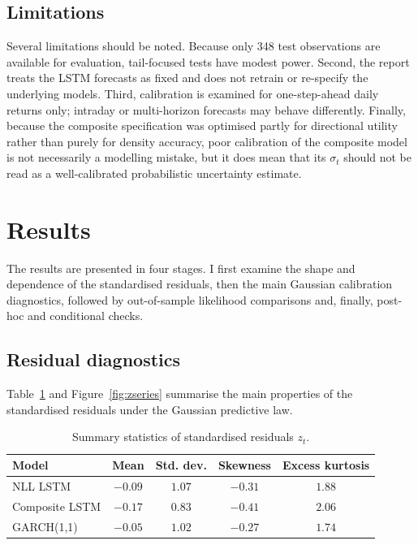 \documentclass[%
 amsmath,amssymb,
 aps,
 pra,
 floatfix,
 raggedbottom,
 nofootinbib,
12pt,]{revtex4-2}
\begin{document}
\subsection{Limitations}

Several limitations should be noted.
Because only 348 test observations are available for evaluation, tail-focused tests have modest power.
Second, the report treats the LSTM forecasts as fixed and does not retrain or re-specify the underlying models.
Third, calibration is examined for one-step-ahead daily returns only; intraday or multi-horizon forecasts may behave differently.
Finally, because the composite specification was optimised partly for directional utility rather than purely for density accuracy, poor calibration of the composite model is not necessarily a modelling mistake, but it does mean that its $\sigma_t$ should not be read as a well-calibrated probabilistic uncertainty estimate.


\section{Results}
\label{sec:results}

The results are presented in four stages. I first examine the shape and dependence of the standardised residuals, then the main Gaussian calibration diagnostics, followed by out-of-sample likelihood comparisons and, finally, post-hoc and conditional checks.

\subsection{Residual diagnostics}

Table~\ref{tab:zstats} and Figure~\ref{fig:zseries} summarise the main properties of the standardised residuals under the Gaussian predictive law.

\begin{table}[htbp]
\centering
\caption{Summary statistics of standardised residuals $z_t$.}
\label{tab:zstats}
\begin{ruledtabular}
\begin{tabular}{lcccc}
\textbf{Model} & \textbf{Mean} & \textbf{Std. dev.} & \textbf{Skewness} & \textbf{Excess kurtosis} \\
\hline
NLL LSTM       & $-0.09$ & $1.07$ & $-0.31$ & $1.88$ \\
Composite LSTM & $-0.17$ & $0.83$ & $-0.41$ & $2.06$ \\
GARCH(1,1)     & $-0.05$ & $1.02$ & $-0.27$ & $1.74$ \\
\end{tabular}
\end{ruledtabular}
\end{table}
\end{document}
